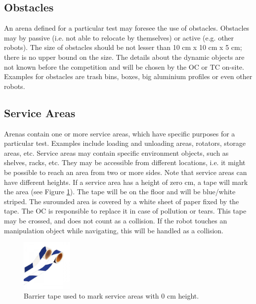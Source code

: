 \subsection{Obstacles}
An arena defined for a particular test may foresee the use of obstacles. Obstacles may by passive (i.e. not able to relocate by themselves) or active (e.g. other robots). The size of obstacles should be not lesser than 10 cm x 10 cm x 5 cm; there is no upper bound on the size. The details about the dynamic objects are not known before the competition and will be chosen by the OC or TC on-site. Examples for obstacles are trash bins, boxes, big aluminium profiles or even other robots.


\subsection{Service Areas} \label{ssec:serviceareas} Arenas contain one or more
service areas, which have specific purposes for a particular test. Examples
include loading and unloading areas, rotators, storage areas,
etc. Service areas may contain specific environment objects, such as shelves,
racks, etc. They may be accessible from different locations, i.e. it might be
possible to reach an area from two or more sides. Note that service areas can
have different heights. If a service area has a height of zero cm, a tape will
mark the area (see Figure \ref{fig:barrier_tape_0cm}). The tape will be on the
floor and will be blue/white striped. The surounded area is
covered by a white sheet of paper fixed by the tape. The OC is responsible
to replace it in case of pollution or tears. This tape may be crossed, and does not
count as a collision. If the robot touches an manipulation object while
navigating, this will be handled as a collision.

\begin{figure} [h!]
\begin{center}
\includegraphics[height = 2.5cm]{./images/barrier_tape_0cm_area.jpg}
\end{center}
\caption{Barrier tape used to mark service areas with 0 cm height.}
\label{fig:barrier_tape_0cm}
\end{figure}


